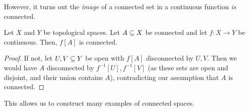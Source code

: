 However, it turns out the \textit{image} of a connected set in a continuous function \textit{is} connected.

\begin{boxlemma}
    Let $X$ and $Y$ be topological spaces. Let $A \subseteq X$ be connected and let $f : X \to Y$ be continuous. Then, $f[A]$ is connected.
\end{boxlemma}
\begin{proof}
    If not, let $U, V \subseteq Y$ be open with $f[A]$ disconnected by $U,V$. Then we would have $A$ disconnected by $f^{-1}[U], f^{-1}[V]$ (as these sets are open and disjoint, and their union contains $A$), contradicting our assumption that $A$ is connected.
\end{proof}

This allows us to construct many examples of connected spaces.

